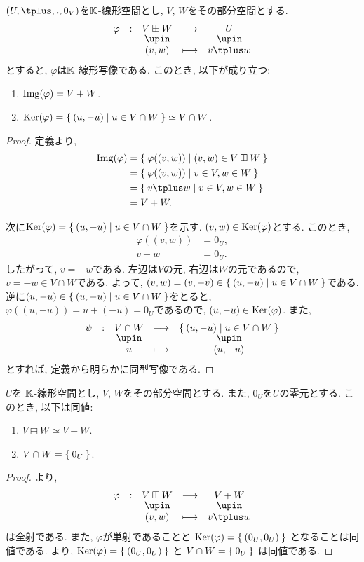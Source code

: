 \begin{prop}
\label{prop:directsum:inner:outer}
  $(U,\plus ,\act,0_V)$を$\mathbb{K}$-線形空間とし,
$V$, $W$をその部分空間とする.
\begin{align*}
\shazo{\varphi}{V\boxplus W}{U}
{(v,w)}{v\plus w}
\end{align*}
とすると, $\varphi$は$\mathbb{K}$-線形写像である.
このとき, 以下が成り立つ:
\begin{enumerate}
\item $\operatorname{Img}(\varphi)=V+W$.
\item $\operatorname{Ker}(\varphi)=\Set{(u,-u) | u\in V\cap W}\simeq V\cap W$.
\end{enumerate}
\end{prop}
\begin{proof}
定義より,
\begin{align*}
\Img(\varphi)&=\Set{\varphi((v,w))|(v,w)\in V\boxplus W}\\
&=\Set{\varphi((v,w))|v\in V, w\in W}\\
&=\Set{v\plus w|v\in V, w\in W}\\
&=V+W.
\end{align*}

次に$\operatorname{Ker}(\varphi)=\Set{(u,-u) | u\in V\cap W}$を示す.
$(v,w)\in \operatorname{Ker}(\varphi)$とする.
このとき,
\begin{align*}
\varphi((v,w))&=0_U,\\
v+w&=0_U.
\end{align*}
したがって, $v=-w$である.
左辺は$V$の元, 右辺は$W$の元であるので,
$v=-w\in V\cap W$である.
よって, $(v,w)=(v,-v)\in \Set{(u,-u) | u\in V\cap W}$である.
逆に$(u,-u)\in \Set{(u,-u) | u\in V\cap W}$をとると,
$\varphi((u,-u))=u\plus (-u)=0_U$であるので,
$(u,-u)\in\operatorname{Ker}(\varphi)$.
また,
\begin{align*}
\shazo{\psi}{V\cap W}{\Set{(u,-u) | u\in V\cap W}}
{u}{(u,-u)}
\end{align*}
とすれば, 定義から明らかに同型写像である.
\end{proof}

\begin{cor}
$U$を
$\mathbb{K}$-線形空間とし,
$V$, $W$をその部分空間とする.
また, $0_U$を$U$の零元とする.
このとき, 以下は同値:
\begin{enumerate}
\item $V\boxplus W \simeq V+W$.
\item $V\cap W=\Set{0_U}$.
\end{enumerate}
\end{cor}
\begin{proof}
より,
\begin{align*}
\shazo{\varphi}{V\boxplus W}{V+W}
{(v,w)}{v\plus w}
\end{align*}
は全射である.
また,
$\varphi$が単射であることと
$\operatorname{Ker}(\varphi)=\Set{(0_U,0_U)}$
となることは同値である.
より,
$\operatorname{Ker}(\varphi)=\Set{(0_U,0_U)}$
と
$V\cap W=\Set{0_U}$
は同値である.
\end{proof}


